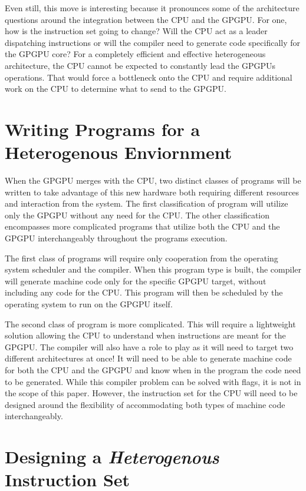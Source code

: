 Even still, this move is interesting because it pronounces some of the architecture questions around the integration between the CPU and the GPGPU. For one, how is the instruction set going to change? Will the CPU act as a leader dispatching instructions or will the compiler need to generate code specifically for the GPGPU core? For a completely efficient and effective heterogeneous architecture, the CPU cannot be expected to constantly lead the GPGPUs operations. That would force a bottleneck onto the CPU and require additional work on the CPU to determine what to send to the GPGPU. 


\section*{Writing Programs for a Heterogenous Enviornment}

When the GPGPU merges with the CPU, two distinct classes of programs will be written to take advantage of this new hardware both requiring different resources and interaction from the system. The first classification of program will utilize only the GPGPU without any need for the CPU. The other classification encompasses more complicated programs that utilize both the CPU and the GPGPU interchangeably throughout the programs execution. 

The first class of programs will require only cooperation from the operating system scheduler and the compiler. When this program type is built, the compiler will generate machine code only for the specific GPGPU target, without including any code for the CPU. This program will then be scheduled by the operating system to run on the GPGPU itself. 

The second class of program is more complicated. This will require a lightweight solution allowing the CPU to understand when instructions are meant for the GPGPU. The compiler will also have a role to play as it will need to target two different architectures at once! It will need to be able to generate machine code for both the CPU and the GPGPU and know when in the program the code need to be generated. While this compiler problem can be solved with flags, it is not in the scope of this paper. However, the instruction set for the CPU will need to be designed around the flexibility of accommodating both types of machine code interchangeably. 


\section*{Designing a \textit{Heterogenous} Instruction Set}

